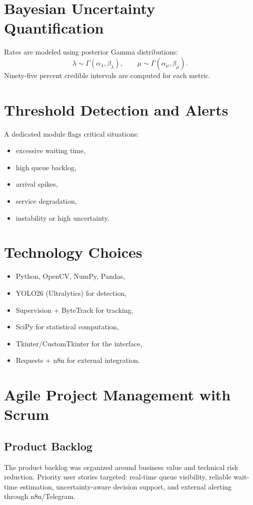 \section{Bayesian Uncertainty Quantification}
Rates are modeled using posterior Gamma distributions:
\begin{equation}
\lambda \sim \Gamma(\alpha_{\lambda}, \beta_{\lambda}),
\qquad
\mu \sim \Gamma(\alpha_{\mu}, \beta_{\mu}).
\end{equation}
Ninety-five percent credible intervals are computed for each metric.

\section{Threshold Detection and Alerts}
A dedicated module flags critical situations:
\begin{itemize}
    \item excessive waiting time,
    \item high queue backlog,
    \item arrival spikes,
    \item service degradation,
    \item instability or high uncertainty.
\end{itemize}

\section{Technology Choices}
\begin{itemize}
    \item Python, OpenCV, NumPy, Pandas,
    \item YOLO26 (Ultralytics) for detection,
    \item Supervision + ByteTrack for tracking,
    \item SciPy for statistical computation,
    \item Tkinter/CustomTkinter for the interface,
    \item Requests + n8n for external integration.
\end{itemize}

\section{Agile Project Management with Scrum}
\subsection{Product Backlog}
The product backlog was organized around business value and technical risk reduction. Priority user stories targeted: real-time queue visibility, reliable wait-time estimation, uncertainty-aware decision support, and external alerting through n8n/Telegram.

